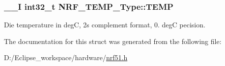 \subsubsection[{T\+E\+M\+P}]{\setlength{\rightskip}{0pt plus 5cm}\+\_\+\+\_\+\+I int32\+\_\+t N\+R\+F\+\_\+\+T\+E\+M\+P\+\_\+\+Type\+::\+T\+E\+M\+P}\label{struct_n_r_f___t_e_m_p___type_a0991e2e212f4a7151d2d27144c31f02d}
Die temperature in deg\+C, 2\textquotesingle{}s complement format, 0. deg\+C pecision. 

The documentation for this struct was generated from the following file\+:\begin{DoxyCompactItemize}
\item 
D\+:/\+Eclipse\+\_\+workspace/hardware/\hyperlink{nrf51_8h}{nrf51.\+h}\end{DoxyCompactItemize}
